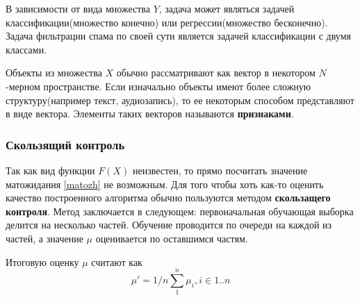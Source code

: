 В зависимости от вида множества $Y$, задача может являться задачей классификации(множество конечно) или регрессии(множество бесконечно).
Задача фильтрации спама по своей сути является задачей классификации с двумя классами.

Объекты из множества $X$ обычно рассматривают как вектор в некотором $N$-мерном пространстве. Если изначально объекты имеют более сложную структуру(например текст, аудиозапись), то ее некоторым способом представляют в виде вектора. Элементы таких векторов называются \textbf{признаками}.

\subsubsection{Скользящий контроль}
Так как вид функции $F(X)$  неизвестен, то прямо посчитать значение матожидания \ref{matozh} не возможным. Для того чтобы хоть как-то оценить качество построенного алгоритма обычно пользуются методом \textbf{скользащего контроля}. Метод заключается в следующем: первоначальная обучающая выборка делится на несколько частей. Обучение проводится по очереди на каждой из частей, а значение $\mu$ оценивается по оставшимся частям.

Итоговую оценку $\mu$ считают как
\begin{equation}
\mu' = 1/n\sum_1^n{\mu_i}, i \in 1..n
\end{equation}




